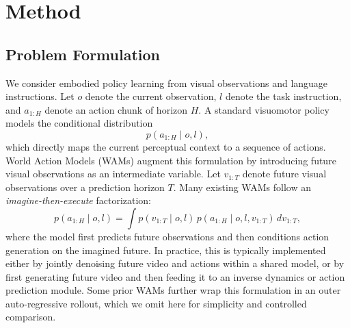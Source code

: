 \section{Method}
\subsection{Problem Formulation}

We consider embodied policy learning from visual observations and language instructions. Let $o$ denote the current observation, $l$ denote the task instruction, and $a_{1:H}$ denote an action chunk of horizon $H$. A standard visuomotor policy models the conditional distribution
\begin{equation}
    p(a_{1:H} \mid o, l),
\end{equation}
which directly maps the current perceptual context to a sequence of actions. World Action Models (WAMs) augment this formulation by introducing future visual observations as an intermediate variable. Let $v_{1:T}$ denote future visual observations over a prediction horizon $T$. Many existing WAMs follow an \emph{imagine-then-execute} factorization:
\begin{equation}
    p(a_{1:H} \mid o, l)
    =
    \int p(v_{1:T} \mid o, l)\,
    p(a_{1:H} \mid o, l, v_{1:T})\, dv_{1:T},
\end{equation}
where the model first predicts future observations and then conditions action generation on the imagined future. In practice, this is typically implemented either by jointly denoising future video and actions within a shared model, or by first generating future video and then feeding it to an inverse dynamics or action prediction module. Some prior WAMs further wrap this formulation in an outer auto-regressive rollout, which we omit here for simplicity and controlled comparison.

